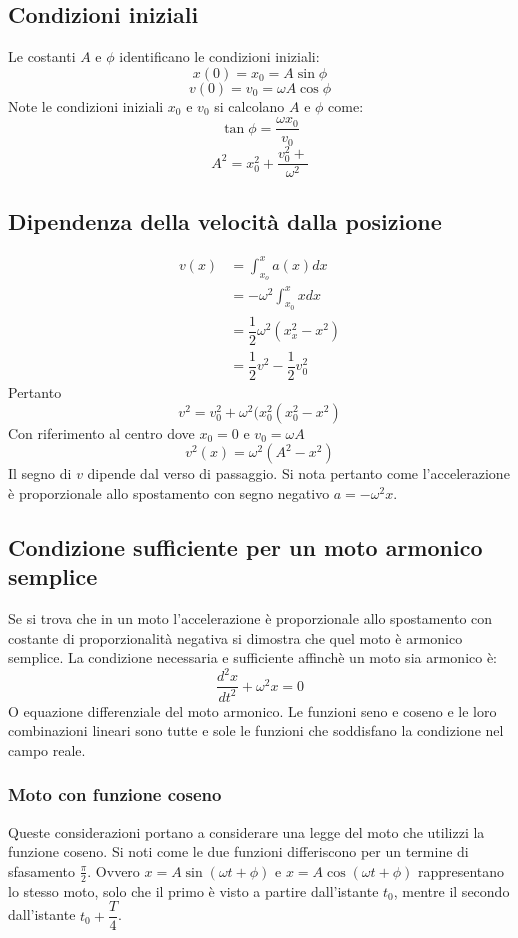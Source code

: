 \documentclass[class=book, crop=false, oneside, 12pt]{standalone}
\begin{document}
	\subsection{Condizioni iniziali}
	Le costanti $A$ e $\phi$ identificano le condizioni iniziali:
	$$ x(0) = x_0 = A \sin\phi$$
	$$v(0) = v_0 = \omega A \cos\phi$$
	Note le condizioni iniziali $x_0$ e $v_0$ si calcolano $A$ e $\phi$ come:
	$$\tan \phi = \dfrac{\omega x_0}{v_0}$$
	$$A^2 = x_0^2 + \dfrac{v_0^2+}{\omega^2}$$
	\subsection{Dipendenza della velocit\`a dalla posizione}
	\begin{align*}
		v(x) &= \int_{x_o}^x a(x)dx\\
		     &=-\omega^2\int_{x_0}^x xdx\\
		     &=\dfrac{1}{2}\omega^2(x_x^2-x^2)\\
		     &=\dfrac{1}{2}v^2 - \dfrac{1}{2}v_0^2
	\end{align*}
	Pertanto
	$$v^2 = v_0^2 + \omega^2(x_0^2(x_0^2-x^2)$$
	Con riferimento al centro dove $x_0 = 0$ e $v_0 = \omega A$
	$$v^2(x)=\omega^2(A^2 - x^2)$$
	Il segno di $v$ dipende dal verso di passaggio.
	Si nota pertanto come l'accelerazione \`e proporzionale allo spostamento con segno negativo $a =-\omega^2 x$.
	\subsection{Condizione sufficiente per un moto armonico semplice}
	Se si trova che in un moto l'accelerazione \`e proporzionale allo spostamento con costante di proporzionalit\`a negativa si dimostra che quel moto \`e armonico semplice.
	La condizione necessaria e sufficiente affinch\`e un moto sia armonico \`e:
	$$\dfrac{d^2x}{dt^2}+\omega^2x=0$$
	O equazione differenziale del moto armonico.
	Le funzioni seno e coseno e le loro combinazioni lineari sono tutte e sole le funzioni che soddisfano la condizione nel campo reale.
		\subsubsection{Moto con funzione coseno}
		Queste considerazioni portano a considerare una legge del moto che utilizzi la funzione coseno.
		Si noti come le due funzioni differiscono per un termine di sfasamento $\frac{\pi}{2}$.
		Ovvero $x=A\sin(\omega t+\phi)$ e $x = A\cos(\omega t+\phi)$ rappresentano lo stesso moto, solo che il primo \`e visto a partire dall'istante $t_0$, mentre il secondo dall'istante $t_0 + \dfrac{T}{4}$.
\end{document}

